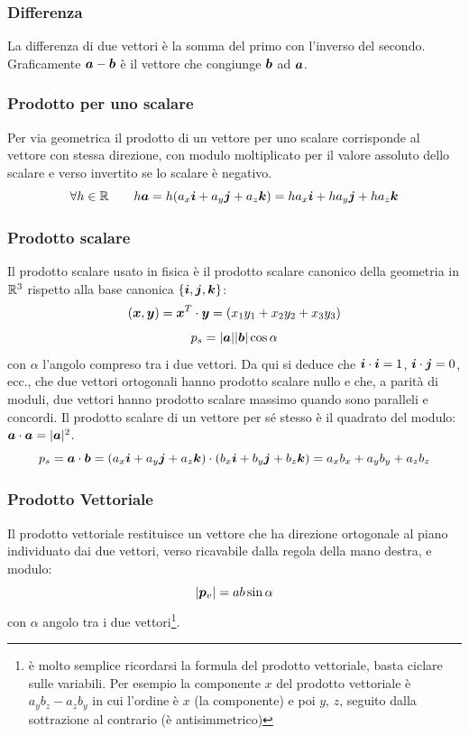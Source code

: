 \subsubsection{Differenza} La differenza di due
vettori è la somma del primo con l'inverso del secondo. Graficamente $\boldsymbol{a}-\boldsymbol{b}$ è il vettore che congiunge $\boldsymbol{b}$ ad $\boldsymbol{a}$.
\subsubsection{Prodotto per uno scalare}
Per via geometrica il prodotto di un vettore per uno scalare corrisponde al vettore con stessa direzione, con modulo moltiplicato per il valore assoluto dello scalare e verso invertito se lo scalare è negativo.
\[\forall h \in \mathbb{R}\qquad h\boldsymbol{a}=h(a_x\boldsymbol{i}+a_y\boldsymbol{j}+a_z\boldsymbol{k})=ha_x\boldsymbol{i}+ha_y\boldsymbol{j}+ha_z\boldsymbol{k}\]
\subsubsection{Prodotto scalare}
Il prodotto scalare usato in fisica è il prodotto scalare canonico della geometria in $\mathbb{R}^3$ rispetto alla base canonica $\{\boldsymbol{i},\boldsymbol{j},\boldsymbol{k}\}$:
\[\left(\boldsymbol{x},\boldsymbol{y}\right)=\boldsymbol{x}^T\cdot\boldsymbol{y}=(x_1y_1+x_2y_2+x_3y_3)\]
\[p_s=|\boldsymbol{a}||\boldsymbol{b}| \cos \alpha\]
con $\alpha$ l'angolo compreso tra i due vettori. Da qui si deduce che $\boldsymbol{i} \cdot \boldsymbol{i}=1$, $\boldsymbol{i}
  \cdot \boldsymbol{j}=0$, ecc., che due vettori ortogonali hanno prodotto scalare nullo e che, a parità di moduli, due vettori hanno prodotto scalare massimo quando sono paralleli e concordi. Il prodotto scalare di un vettore per sé stesso è il quadrato del modulo: $\boldsymbol{a}\cdot\boldsymbol{a}=|\boldsymbol{a}|^2$.
\[p_s=\boldsymbol{a} \cdot \boldsymbol{b}=(a_x\boldsymbol{i}+a_y\boldsymbol{j}+a_z\boldsymbol{k})\cdot(b_x\boldsymbol{i}+b_y\boldsymbol{j}+b_z\boldsymbol{k})=a_xb_x+a_yb_y+a_zb_z\]
\subsubsection{Prodotto Vettoriale}
Il prodotto vettoriale restituisce un vettore che ha direzione ortogonale al piano individuato dai due vettori, verso ricavabile dalla regola della mano destra, e modulo:
\[|\boldsymbol{p}_v|=ab\sin \alpha\] con $\alpha$ angolo tra i due vettori\footnote{è molto semplice ricordarsi la formula del prodotto vettoriale, basta ciclare sulle variabili. Per esempio la componente $x$ del prodotto vettoriale è $a_yb_z-a_zb_y$ in cui l'ordine è $x$ (la componente) e poi $y$, $z$, seguito dalla sottrazione al contrario (è antisimmetrico)}.


